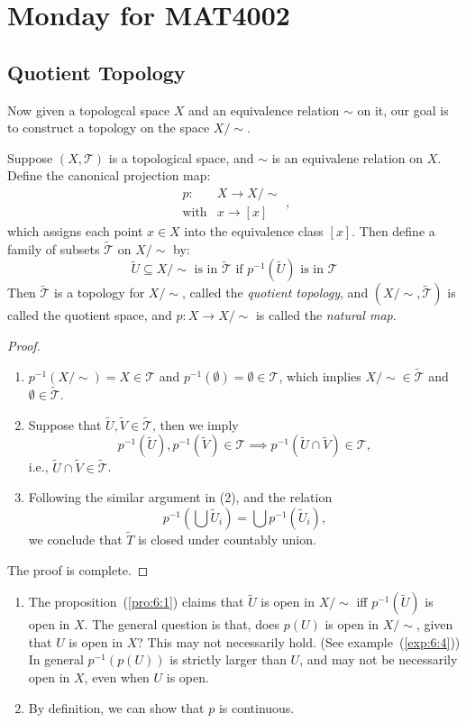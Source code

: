 \section{Monday for MAT4002}
\subsection{Quotient Topology}
Now given a topologcal space $X$ and an equivalence relation $\sim$ on it, our goal is to construct a topology on the space $X/\sim$.
\begin{proposition}\label{pro:6:1}
Suppose $(X,\mathcal{T})$ is a topological space, and $\sim$ is an equivalene relation on $X$.
Define the canonical projection map:
\[
\begin{array}{ll}
p:&X\to X/\sim\\
\text{with}&x\to[x]
\end{array},
\]
which assigns each point $x\in X$ into the equivalence class $[x]$.
Then define a family of subsets $\tilde{\mathcal{T}}$ on $X/\sim$ by:
\[
\tilde{U}\subseteq X/\sim
\text{ is in $\tilde{\mathcal{T}}$ if }
p^{-1}(\tilde{U})
\text{ is in $\mathcal{T}$}
\]
Then $\tilde{\mathcal{T}}$ is a topology for $X/\sim$, called the \emph{quotient topology}, and $(X/\sim,\tilde{\mathcal{T}})$ is called the quotient space,
and $p:X\to X/\sim$ is called the \emph{natural map}.
\end{proposition}

\begin{proof}
\begin{enumerate}
\item
$p^{-1}(X/\sim) =X\in\mathcal{T}$ and $p^{-1}(\emptyset) = \emptyset\in\mathcal{T}$, which implies 
$X/\sim\in\tilde{\mathcal{T}}$ and $\emptyset\in\tilde{\mathcal{T}}$.
\item
Suppose that $\tilde{U},\tilde{V}\in\tilde{\mathcal{T}}$, then we imply
\[
p^{-1}(\tilde{U}),p^{-1}(\tilde{V})\in\mathcal{T}
\implies
p^{-1}(\tilde{U}\cap\tilde{V})\in\mathcal{T},
\]
i.e., $\tilde{U}\cap\tilde{V}\in\tilde{\mathcal{T}}$.
\item
Following the similar argument in (2), and the relation
\[
p^{-1}\left(\bigcup\tilde{U}_i\right)=\bigcup p^{-1}(\tilde{U}_i),
\]
we conclude that $\tilde{T}$ is closed under countably union.
\end{enumerate}
The proof is complete.
\end{proof}
\begin{remark}
\begin{enumerate}
\item
The proposition~(\ref{pro:6:1}) claims that $\tilde{U}$ is open in $X/\sim$ iff $p^{-1}(\tilde{U})$ is open in $X$.
The general question is that, does $p(U)$ is open in $X/\sim$, given that $U$ is open in $X$?
This may not necessarily hold. (See example~(\ref{exp:6:4}))
In general $p^{-1}(p(U))$ is strictly larger than $U$, and may not be necessarily open in $X$, even when $U$ is open.
\item
By definition, we can show that $p$ is continuous.
\end{enumerate}
\end{remark}

